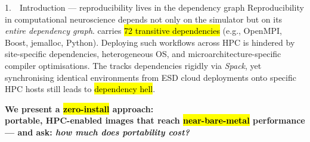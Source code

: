 \begin{block}{1.~\ Introduction --- reproducibility lives in the dependency graph}
\large
Reproducibility in computational neuroscience depends not only on the simulator but on its \emph{entire dependency
graph}.  carries \hl{72 transitive dependencies} (e.g., OpenMPI, Boost, jemalloc, Python). Deploying such
workflows across HPC is hindered by site-specific dependencies, heterogeneous OS, and microarchitecture-specific
compiler optimisations. The  tracks dependencies rigidly via \emph{Spack},
yet synchronising identical environments from ESD cloud deployments onto specific HPC hosts still leads to
\hl{dependency hell}.
\medskip

\centering\textbf{\large We present a \hl{zero-install} approach:\\portable, HPC-enabled  images that
reach \hl{near-bare-metal} performance --- and ask: \emph{how much does portability cost?}}
\end{block}
